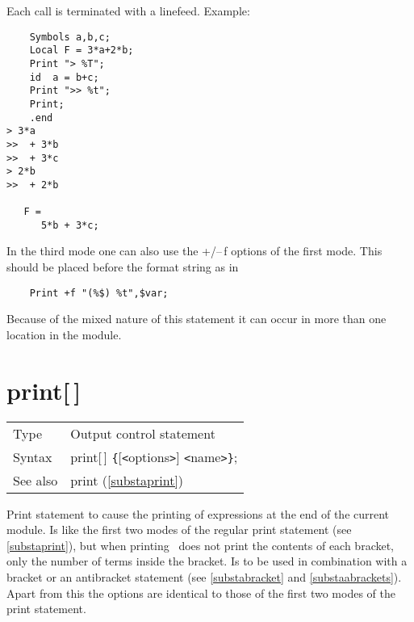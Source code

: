 
\leftvitem{1cm}{\%}


\noindent Each call is terminated with a linefeed. Example:
\begin{verbatim}
    Symbols a,b,c;
    Local F = 3*a+2*b;
    Print "> %T";
    id  a = b+c;
    Print ">> %t";
    Print;
    .end
> 3*a
>>  + 3*b
>>  + 3*c
> 2*b
>>  + 2*b

   F =
      5*b + 3*c;
\end{verbatim}

\noindent In the third mode one can also use the +/--\,f options of the 
first mode. This should be placed before the format string as in
\begin{verbatim}
    Print +f "(%$) %t",$var;
\end{verbatim}

\noindent Because of the mixed nature of this statement it can occur in 
more than one location in the module. \vspace{10mm}


\section{\texorpdfstring{print[\,]}{print[ ]}}
\label{substaprintc}

\noindent \begin{tabular}{ll}
Type & Output control statement\\
Syntax & print[\,] \verb:{:[{\tt<}options{\tt>}] {\tt<}name{\tt>}\verb:}:;
\\ See also & print (\ref{substaprint})
\end{tabular}\vspace{4mm}

\noindent Print statement to cause the printing 
of expressions at the end of the current module. Is like the first two 
modes of the regular print statement (see \ref{substaprint}), but when 
printing \FORM\ does not print the contents of each bracket, 
only the number of terms inside the bracket. Is to be used in combination 
with a bracket or an antibracket statement (see 
\ref{substabracket} and \ref{substaabrackets}). Apart from this the options 
are identical to those of the first two modes of the print statement. 
\vspace{10mm}

